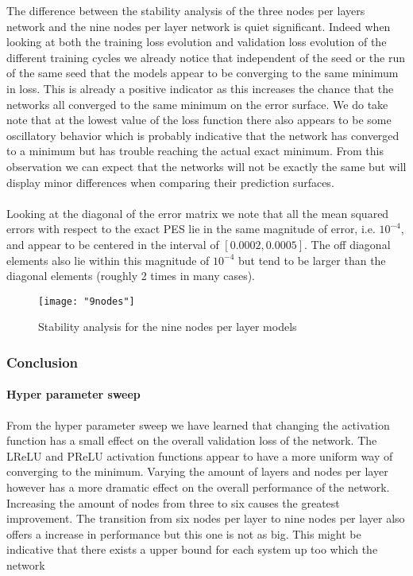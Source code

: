 \documentclass[12pt]{article}
\begin{document}
The difference between the stability analysis of the three nodes per layers network and the nine nodes per layer network is quiet significant. Indeed when looking at both the training loss evolution and validation loss evolution of the different training cycles we already notice that independent of the seed or the run of the same seed that the models appear to be converging to the same minimum in loss. This is already a positive indicator as this increases the chance that the networks all converged to the same minimum on the error surface. We do take note that at the lowest value of the loss function there also appears to be some oscillatory behavior which is probably indicative that the network has converged to a minimum but has trouble reaching the actual exact minimum. From this observation we can expect that the networks will not be exactly the same but will display minor differences when comparing their prediction surfaces.
\\
\\
Looking at the diagonal of the error matrix we note that all the mean squared errors with respect to the exact PES lie in the same magnitude of error, i.e. $10^{-4}$, and appear to be centered in the interval of $\left[0.0002, 0.0005\right]$. The off diagonal elements also lie within this magnitude of $10^{-4}$ but tend to be larger than the diagonal elements (roughly 2 times in many cases). 
\begin{figure}[H]
	\centering
	\texttt{[image: "9nodes"]}
	\caption{Stability analysis for the nine nodes per layer models}
\end{figure}

\subsubsection{Conclusion}

\paragraph{Hyper parameter sweep}
From the hyper parameter sweep we have learned that changing the activation function has a small effect on the overall validation loss of the network. The LReLU and PReLU activation functions appear to have a more uniform way of converging to the minimum. Varying the amount of layers and nodes per layer however has a more dramatic effect on the overall performance of the network. Increasing the amount of nodes from three to six causes the greatest improvement. The transition from six nodes per layer to nine nodes per layer also offers a increase in performance but this one is not as big. This might be indicative that there exists a upper bound for each system up too which the network   
\end{document}

